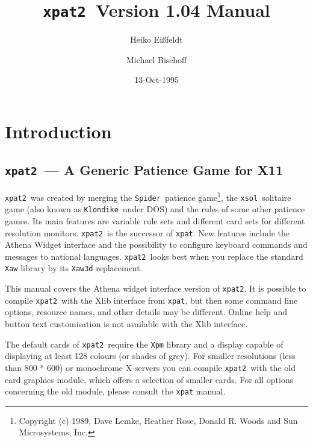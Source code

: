 \newcommand{\xpat}{{\tt xpat2}}
\newcommand{\xsol}{{\tt xsol}}
\newcommand{\freecell}{{\tt FreeCell}}
\newcommand{\klondike}{{\tt Klondike}}
\newcommand{\spider}{{\tt Spider}}
\newcommand{\gypsy}{{\tt Gypsy}}
\newcommand{\seahaven}{{\tt Seahaven Towers}}
\title{\xpat\ Version 1.04 Manual}
\author{Heiko Ei\ss{}feldt \and Michael Bischoff}
\date{13-Oct-1995}

\maketitle
\tableofcontents

\newpage
\section{Introduction}
\subsection{\xpat\ --- A Generic Patience Game for X11}
\xpat\ was created by merging the \spider\ patience game\footnote{Copyright (c)
  1989, Dave Lemke, Heather Rose, Donald R. Woods and Sun Microsystems, Inc.},
the \xsol\ solitaire game (also known as \klondike\ under DOS) and the rules of
some other patience games.  Its main features are variable rule sets and
different card sets for different resolution monitors.
\xpat\ is the successor of {\tt xpat}. New features include the Athena Widget
interface and the possibility to configure keyboard commands and messages to
national languages. \xpat\ looks best when you replace the standard {\tt Xaw}
library by its {\tt Xaw3d} replacement.


This manual covers the Athena widget interface version of \xpat. It is possible
to compile \xpat\ with the Xlib interface from {\tt xpat}, but then some
command line options, resource names,  and other details may be different. 
Online help and button text customisation is not available with the Xlib
interface. %

The default cards of \xpat\ require the {\tt Xpm} library and a display
capable of displaying at least 128 colours (or shades of grey).
For smaller resolutions (less than 800 * 600) or monochrome X-servers
you can compile \xpat\ with the old card graphics module, which offers
a selection of smaller cards. For all options concerning the old module,
please consult the {\tt xpat} manual.


